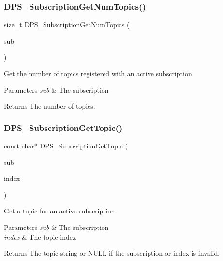 \subsubsection{\texorpdfstring{D\+P\+S\+\_\+\+Subscription\+Get\+Num\+Topics()}{DPS\_SubscriptionGetNumTopics()}}
{\footnotesize\ttfamily size\+\_\+t D\+P\+S\+\_\+\+Subscription\+Get\+Num\+Topics (\begin{DoxyParamCaption}\item[{const \hyperlink{group__subscription_gadb927c4c1b7306867a75fc4288b54af7}{D\+P\+S\+\_\+\+Subscription} $\ast$}]{sub }\end{DoxyParamCaption})}



Get the number of topics registered with an active subscription. 


\begin{DoxyParams}{Parameters}
{\em sub} & The subscription\\
\hline
\end{DoxyParams}
\begin{DoxyReturn}{Returns}
The number of topics. 
\end{DoxyReturn}
\mbox{\label{group__subscription_gaacc63deda2f2d97cf3f44ca84784b2f6}} 
\subsubsection{\texorpdfstring{D\+P\+S\+\_\+\+Subscription\+Get\+Topic()}{DPS\_SubscriptionGetTopic()}}
{\footnotesize\ttfamily const char$\ast$ D\+P\+S\+\_\+\+Subscription\+Get\+Topic (\begin{DoxyParamCaption}\item[{const \hyperlink{group__subscription_gadb927c4c1b7306867a75fc4288b54af7}{D\+P\+S\+\_\+\+Subscription} $\ast$}]{sub,  }\item[{size\+\_\+t}]{index }\end{DoxyParamCaption})}



Get a topic for an active subscription. 


\begin{DoxyParams}{Parameters}
{\em sub} & The subscription \\
\hline
{\em index} & The topic index\\
\hline
\end{DoxyParams}
\begin{DoxyReturn}{Returns}
The topic string or N\+U\+LL if the subscription or index is invalid. 
\end{DoxyReturn}
